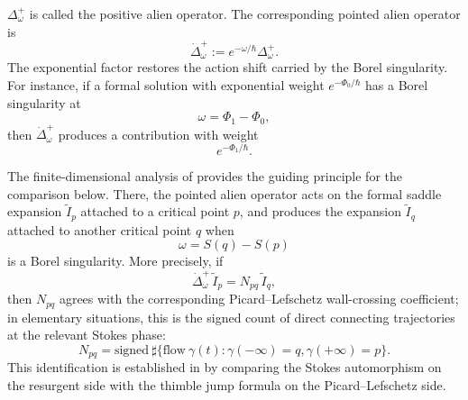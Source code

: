 \documentclass[11pt]{amsart}
\theoremstyle{plain}
\theoremstyle{definition}
\begin{document}
$\Delta_{\omega}^{+}$ is called the positive alien operator. The corresponding pointed alien operator is
\begin{equation*}%
\dot\Delta_{\omega}^{+}
:=
e^{-\omega/\hbar}\Delta_{\omega}^{+}.
\end{equation*}
The exponential factor restores the action shift carried by the Borel
singularity.  For instance, if a formal solution with exponential weight
$e^{-\Phi_0/\hbar}$ has a Borel singularity at
\[
\omega=\Phi_1-\Phi_0,
\]
then $\dot\Delta_{\omega}^{+}$ produces a contribution with weight
\[
e^{-\Phi_1/\hbar}.
\]

The finite-dimensional analysis of \cite{LiLiTang2026} provides the guiding
principle for the comparison below.  There, the pointed alien operator acts on
the formal saddle expansion $\widetilde I_p$ attached to a critical point
$p$, and produces the expansion $\widetilde I_q$ attached to another
critical point $q$ when
\[
\omega=S(q)-S(p)
\]
is a Borel singularity.  More precisely, if
\[
\dot\Delta_{\omega}^{+}\,\widetilde I_p
=
N_{pq}\,\widetilde I_q,
\]
then $N_{pq}$ agrees with the corresponding Picard--Lefschetz
wall-crossing coefficient; in elementary situations, this is the signed
count of direct connecting trajectories at the relevant Stokes phase:
$$
N_{pq}=\text{signed}\ \sharp \{\text{flow}\ \gamma(t): \gamma(-\infty)=q, \gamma(+\infty)=p\}.
$$
This identification is established in \cite{LiLiTang2026} by comparing the
Stokes automorphism on the resurgent side with the thimble jump formula on
the Picard--Lefschetz side.
\end{document}
